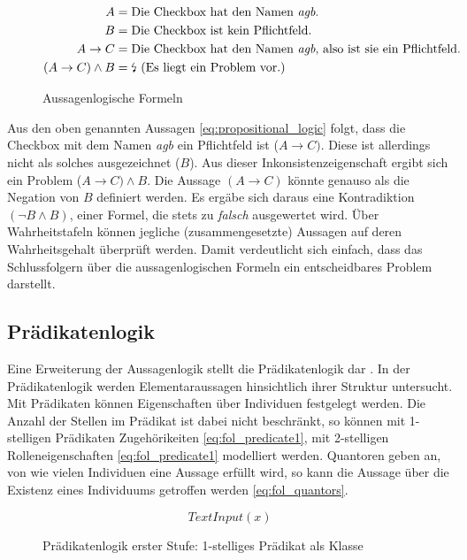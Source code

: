 \documentclass[runningheads,a4paper]{llncs}
\begin{document}
\begin{figure}
\begin{align}
\begin{split}
A &= \textnormal{Die Checkbox hat den Namen \textit{agb}.}\\
B &= \textnormal{Die Checkbox ist kein Pflichtfeld.}\\
A \to C &= \textnormal{Die Checkbox hat den Namen \textit{agb}, also ist sie ein Pflichtfeld.}\\
(A \to C) \land B &= \textnormal{\lightning\ (Es liegt ein Problem vor.)}
\label{eq:propositional_logic}
\end{split}
\end{align}
\caption{Aussagenlogische Formeln}
\end{figure}
 
Aus den oben genannten Aussagen \eqref{eq:propositional_logic} folgt, dass die Checkbox mit dem Namen \textit{agb} ein Pflichtfeld ist (\(A \to C)\). 
Diese ist allerdings nicht als solches ausgezeichnet (\(B\)). 
Aus dieser Inkonsistenzeigenschaft ergibt sich ein Problem (\(A \to C) \land B\). 
Die Aussage \((A \to C)\) könnte genauso als die Negation von \(B\) definiert werden. 
Es ergäbe sich daraus eine Kontradiktion \((\neg B \land B)\), einer Formel, die stets zu \textit{falsch} ausgewertet wird. 
Über Wahrheitstafeln können jegliche (zusammengesetzte) Aussagen auf deren Wahrheitsgehalt überprüft werden. 
Damit verdeutlicht sich einfach, dass das Schlussfolgern über die aussagenlogischen Formeln ein entscheidbares Problem darstellt.
\\

\subsection{Prädikatenlogik}
\label{sec:prediactelogic}

Eine Erweiterung der Aussagenlogik stellt die Prädikatenlogik dar \cite[p. 6,367--373]{foundations}.
In der Prädikatenlogik werden Elementaraussagen hinsichtlich ihrer Struktur untersucht.
Mit Prädikaten können Eigenschaften über Individuen festgelegt werden. 
Die Anzahl der Stellen im Prädikat ist dabei nicht beschränkt, so können mit 1-stelligen Prädikaten Zugehörikeiten \eqref{eq:fol_predicate1}, mit 2-stelligen Rolleneigenschaften \eqref{eq:fol_predicate1} modelliert werden.  
Quantoren geben an, von wie vielen Individuen eine Aussage erfüllt wird, so kann die Aussage über die Existenz eines Individuums getroffen werden \eqref{eq:fol_quantors}.
\begin{figure}
\begin{equation}
TextInput(x)
\label{eq:fol_predicate1}
\end{equation}
\caption{Prädikatenlogik erster Stufe: 1-stelliges Prädikat als Klasse}
\end{figure}
\end{document}
